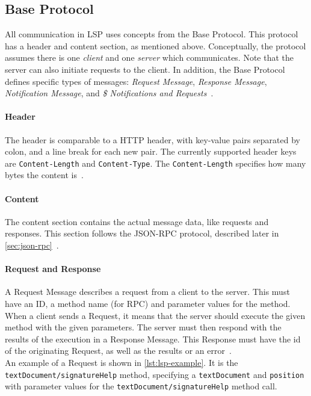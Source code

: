 \subsection{Base Protocol}\label{sec:base-protocol}

All communication in \acrshort{LSP} uses concepts from the Base Protocol.
This protocol has a header and content section, as mentioned above.
Conceptually, the protocol assumes there is one \textit{client} and one \textit{server} which communicates.
Note that the server can also initiate requests to the client.
In addition, the Base Protocol defines specific types of messages: \textit{Request Message}, \textit{Response Message}, \textit{Notification Message}, and \textit{\$ Notifications and Requests}~\cite{microsoftLanguageServerProtocol2021}.

\paragraph{Header}
The header is comparable to a HTTP header, with key-value pairs separated by colon, and a line break for each new pair.
The currently supported header keys are \texttt{Content-Length} and \texttt{Content-Type}.
The \texttt{Content-Length} specifies how many bytes the content is~\cite{microsoftLanguageServerProtocol2021}.

\paragraph{Content}
The content section contains the actual message data, like requests and responses.
This section follows the \gls{JSON-RPC} protocol, described later in \cref{sec:json-rpc}~\cite{microsoftLanguageServerProtocol2021}.

\paragraph{Request and Response}
A Request Message describes a request from a client to the server.
This must have an ID, a method name (for \gls{RPC}) and parameter values for the method.
When a client sends a Request, it means that the server should execute the given method with the given parameters.
The server must then respond with the results of the execution in a Response Message.
This Response must have the id of the originating Request, as well as the results or an error~\cite{microsoftLanguageServerProtocol2021}.\\

An example of a Request is shown in \cref{lst:lsp-example}.
It is the \texttt{textDocument/signatureHelp} method, specifying a \texttt{textDocument} and \texttt{position} with parameter values for the \texttt{textDocument/signatureHelp} method call.

